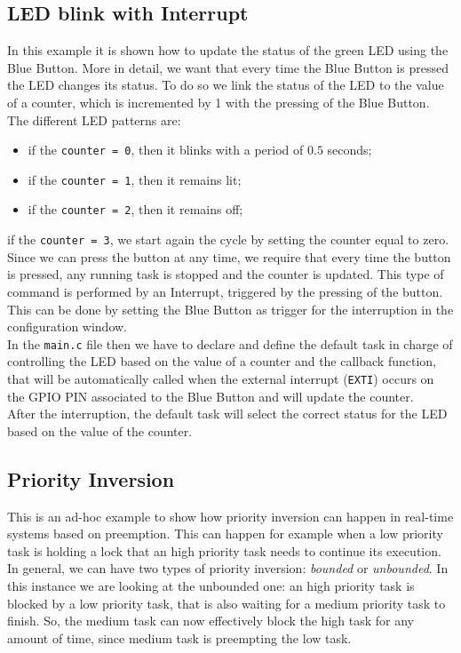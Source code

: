 \documentclass[a4paper,11pt]{report}
\begin{document}
\subsection{LED blink with Interrupt}
In this example it is shown how to update the status of the green LED using the Blue Button. More in detail, we want that every time the Blue Button is pressed the LED changes its status. To do so we link the status of the LED to the value of a counter, which is incremented by 1 with the pressing of the Blue Button.\\
The different LED patterns are:
\begin{itemize}
    \item if the \texttt{counter = 0}, then it blinks with a period of $0.5$ seconds;
    \item if the \texttt{counter = 1}, then it remains lit;
    \item if the \texttt{counter = 2}, then it remains off;
\end{itemize}
if the \texttt{counter = 3}, we start again the cycle by setting the counter equal to zero.\\
Since we can press the button at any time, we require that every time the button is pressed, any running task is stopped and the counter is updated. This type of command is performed by an Interrupt, triggered by the pressing of the button. This can be done by setting the Blue Button as trigger for the interruption in the configuration window.\\
In the \texttt{main.c} file then we have to declare and define the default task in charge of controlling the LED based on the value of a counter and the callback function, that will be automatically called when the external interrupt (\texttt{EXTI}) occurs on the GPIO PIN associated to the Blue Button and will update the counter.\\
After the interruption, the default task will select the correct status for the LED based on the value of the counter.
  
\subsection{Priority Inversion}
This is an ad-hoc example to show how priority inversion can happen in real-time systems based on preemption. This can happen for example when a low priority task is holding a lock that an high priority task needs to continue its execution.\\
In general, we can have two types of priority inversion: \textit{bounded} or \textit{unbounded}. In this instance we are looking at the unbounded one: an high priority task is blocked by a low priority task, that is also waiting for a medium priority task to finish. So, the medium task can now effectively block the high task for any amount of time, since medium task is preempting the low task. \\
\end{document}
